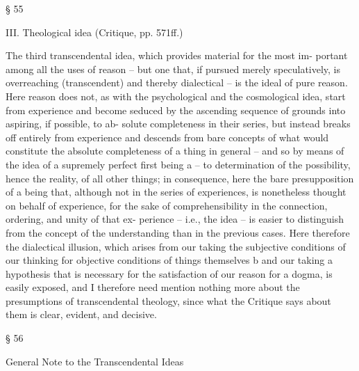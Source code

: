 § 55

III. Theological idea (Critique, pp. 571ff.)

The third transcendental idea, which provides material for the most im-
portant among all the uses of reason – but one that, if pursued merely
speculatively, is overreaching (transcendent) and thereby dialectical – is
the ideal of pure reason. Here reason does not, as with the psychological
and the cosmological idea, start from experience and become seduced
by the ascending sequence of grounds into aspiring, if possible, to ab-
solute completeness in their series, but instead breaks off entirely from
experience and descends from bare concepts of what would constitute
the absolute completeness of a thing in general – and so by means of
the idea of a supremely perfect ﬁrst being a – to determination of the
possibility, hence the reality, of all other things; in consequence, here
the bare presupposition of a being that, although not in the series of
experiences, is nonetheless thought on behalf of experience, for the sake
of comprehensibility in the connection, ordering, and unity of that ex-
perience – i.e., the idea – is easier to distinguish from the concept of the
understanding than in the previous cases. Here therefore the dialectical
illusion, which arises from our taking the subjective conditions of our
thinking for objective conditions of things themselves b and our taking a
hypothesis that is necessary for the satisfaction of our reason for a dogma,
is easily exposed, and I therefore need mention nothing more about the
presumptions of transcendental theology, since what the Critique says
about them is clear, evident, and decisive.

§ 56

General Note to the Transcendental Ideas

